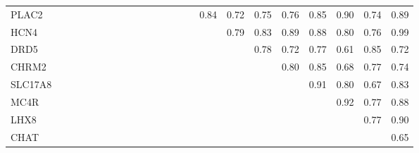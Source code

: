 \begin{longtable}{lrrrrrrrrrrrrrrrrrrrrrr}
PLAC2   &             &             &             &              &             &              &              &               &             &             &             &             &            &             &       0.84 &       0.72 &        0.75 &          0.76 &       0.85 &       0.90 &       0.74 &          0.89 \\
HCN4    &             &             &             &              &             &              &              &               &             &             &             &             &            &             &            &       0.79 &        0.83 &          0.89 &       0.88 &       0.80 &       0.76 &          0.99 \\
DRD5    &             &             &             &              &             &              &              &               &             &             &             &             &            &             &            &            &        0.78 &          0.72 &       0.77 &       0.61 &       0.85 &          0.72 \\
CHRM2   &             &             &             &              &             &              &              &               &             &             &             &             &            &             &            &            &             &          0.80 &       0.85 &       0.68 &       0.77 &          0.74 \\
SLC17A8 &             &             &             &              &             &              &              &               &             &             &             &             &            &             &            &            &             &               &       0.91 &       0.80 &       0.67 &          0.83 \\
MC4R    &             &             &             &              &             &              &              &               &             &             &             &             &            &             &            &            &             &               &            &       0.92 &       0.77 &          0.88 \\
LHX8    &             &             &             &              &             &              &              &               &             &             &             &             &            &             &            &            &             &               &            &            &       0.77 &          0.90 \\
CHAT    &             &             &             &              &             &              &              &               &             &             &             &             &            &             &            &            &             &               &            &            &            &          0.65 \\
\end{longtable}


